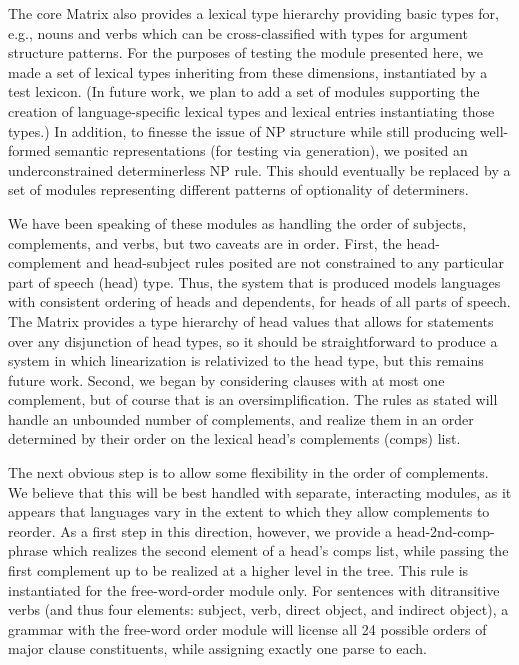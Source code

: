 The core Matrix also provides a lexical type hierarchy providing basic
types for, e.g., nouns and verbs which can be
cross-classified with types for argument structure patterns.
For the purposes of testing the module presented here, we made a set
of lexical types inheriting from these dimensions, instantiated by a
test lexicon.  (In future work, we plan to add a set of modules
supporting the creation of language-specific lexical types and lexical
entries instantiating those types.)  In addition, to finesse the issue
of NP structure while still producing well-formed semantic
representations (for testing via generation), we posited an
underconstrained determinerless NP rule.  This should eventually be
replaced by a set of modules representing different patterns of
optionality of determiners.

We have been speaking of these modules as handling the order of
subjects, complements, and verbs, but two caveats are in order.  First,
the head-complement and head-subject rules posited are not constrained
to any particular part of speech (head) type. Thus, the system that is
produced models languages with consistent ordering of heads and
dependents, for heads of all parts of speech.  The Matrix provides a
type hierarchy of {\sc head} values that allows for statements over any
disjunction of head types, so it should be straightforward to produce
a system in which linearization is relativized to the head type, but
this remains future work.  Second, we began by considering clauses
with at most one complement, but of course that is an
oversimplification.  The rules as stated will handle an unbounded
number of complements, and realize them in an order determined by
their order on the lexical head's complements ({\sc comps}) list.

The next obvious step is to allow some flexibility in the order of
complements.  We believe that this will be best handled with separate,
interacting modules, as it appears that languages vary in the
extent to which they allow complements to reorder.
As a first step in this direction,
however, we provide a head-2nd-comp-phrase which realizes the
second element of a head's {\sc comps} list, while passing the first
complement up to be realized at a higher level in the tree.  This rule
is instantiated for the free-word-order module only.  For sentences
with ditransitive verbs (and thus four elements: subject, verb, direct
object, and indirect object), a grammar with the free-word order
module will license all 24 possible orders of major clause
constituents, while assigning exactly one parse to each.

